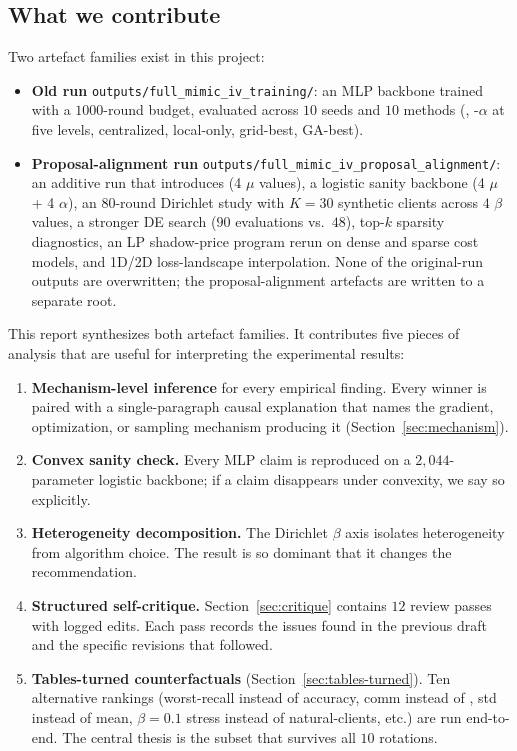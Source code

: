 \subsection{What we contribute}
Two artefact families exist in this project:
\begin{itemize}[leftmargin=*]
    \item \textbf{Old run} \texttt{outputs/full\_mimic\_iv\_training/}: an MLP
        backbone trained with a $1000$-round budget, evaluated across $10$ seeds
        and $10$ methods (\fedavg{}, \cvar{}-$\alpha$ at five levels,
        centralized, local-only, grid-best, GA-best).
    \item \textbf{Proposal-alignment run} \texttt{outputs/full\_mimic\_iv\_proposal\_alignment/}:
        an additive run that introduces \fedprox{} (4 $\mu$ values), a logistic
        sanity backbone (4 \fedprox{} $\mu$ + 4 \cvar{} $\alpha$), an $80$-round
        Dirichlet study with $K\!=\!30$ synthetic clients across $4$ $\beta$
        values, a stronger DE search ($90$ evaluations vs.\ $48$), top-$k$
        sparsity diagnostics, an LP shadow-price program rerun on dense and
        sparse cost models, and 1D/2D loss-landscape interpolation. None of the
        original-run outputs are overwritten; the proposal-alignment artefacts
        are written to a separate root.
\end{itemize}
This report synthesizes both artefact families. It contributes five pieces of
analysis that are useful for interpreting the experimental results:
\begin{enumerate}[leftmargin=*,topsep=2pt]
    \item \textbf{Mechanism-level inference} for every empirical finding. Every
        winner is paired with a single-paragraph causal explanation that names
        the gradient, optimization, or sampling mechanism producing it
        (Section~\ref{sec:mechanism}).
    \item \textbf{Convex sanity check.} Every MLP claim is reproduced on a
        $2{,}044$-parameter logistic backbone; if a claim disappears under
        convexity, we say so explicitly.
    \item \textbf{Heterogeneity decomposition.} The Dirichlet $\beta$ axis
        isolates heterogeneity from algorithm choice. The result is so dominant
        that it changes the recommendation.
    \item \textbf{Structured self-critique.} Section~\ref{sec:critique}
        contains $12$ review passes with logged edits. Each pass records the
        issues found in the previous draft and the specific revisions that
        followed.
    \item \textbf{Tables-turned counterfactuals} (Section~\ref{sec:tables-turned}).
        Ten alternative rankings (worst-recall instead of accuracy, comm
        instead of \auprc{}, std instead of mean, $\beta\!=\!0.1$ stress
        instead of natural-clients, etc.) are run end-to-end. The central
        thesis is the subset that survives all $10$ rotations.
\end{enumerate}

